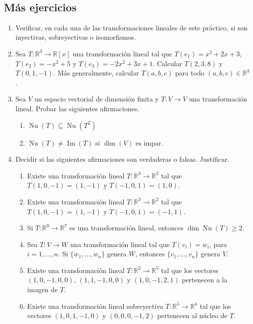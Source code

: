 \documentclass[12pt]{amsart}
\begin{document}
\

\subsection*{M\'as ejercicios}

\begin{enumerate}[resume, topsep=5pt,itemsep=5pt]
  \item Verificar, en cada una de las transformaciones lineales de este pr\'actico, si son inyectivas, sobreyectivas o isomorfismos.
  \item Sea $T: \mathbb{R}^3\longrightarrow\mathbb{R}[x]$ una transformaci\'on lineal tal que $T(e_1)=x^2+2x+3$, $T(e_2)=-x^2+5$ y $T(e_3)=-2x^2+3x+1$. Calcular $T(2,3,8)$ y $T(0,1,-1)$. M\'as generalmente, calcular $T(a,b,c)$ para todo $(a,b,c)\in\mathbb{R}^3$. 
   \item Sea $V$ un espacio vectorial de dimensi\'on finita y $T:V\longrightarrow V$ una transformaci\'on lineal. Probar las siguientes afirmaciones.
   \begin{enumerate}
    \item $\operatorname{Nu}(T)\subseteq\operatorname{Nu}(T^2)$
    \item $\operatorname{Nu}(T)\neq\operatorname{Im}(T)$ si $\dim(V)$ es impar.
    \end{enumerate}

\item Decidir si las siguientes afirmaciones son verdaderas o falsas. Justificar.

\begin{enumerate}
\item Existe una transformaci\' on lineal $T : \mathbb R^3 \to \mathbb R^2$ tal que $T(1, 0,-1) = (1, -1)$ y $T(-1, 0, 1) = (1, 0)$.
\item Existe una transformaci\' on lineal $T : \mathbb R^3 \to \mathbb R^2$ tal que $T(1, 0,-1) = (1, -1)$ y $T(-1, 0, 1) = (-1, 1)$.
\item  Si $T : \mathbb R^9 \to \mathbb R^7$ es una transformaci\' on lineal, entonces $\dim \operatorname{Nu}(T) \geq  2$.
\item Sea $T : V \to W$ una transformaci\' on lineal tal que $T(v_i) = w_i$, para $i = 1, \dots , n$. Si $\{w_1, \dots , w_n\}$ genera $W$, entonces
$\{v_1, \dots , v_n\}$ genera $V$.
\item Existe una transformaci\' on lineal $T : \mathbb R^2 \to \mathbb R^5$ tal que los vectores $(1, 0, -1, 0, 0)$, $(1, 1, -1, 0, 0)$ y $(1, 0, -1, 2, 1)$ pertenecen a la imagen de $T$.
\item Existe una transformaci\' on lineal sobreyectiva $T : \mathbb R^5 \to \mathbb R^4$ tal que los vectores $(1, 0, 1, -1, 0)$ y $(0, 0, 0, -1, 2)$
pertenecen al n\' ucleo de $T$.
\end{enumerate}


\end{enumerate}
\end{document}
